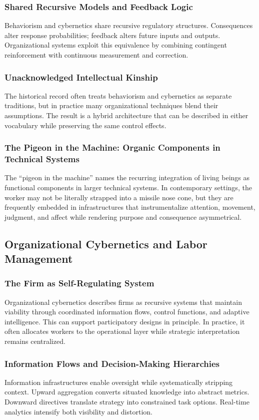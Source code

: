 \documentclass[11pt, a4paper]{article}
\begin{document}
\subsubsection{Shared Recursive Models and Feedback Logic}
Behaviorism and cybernetics share recursive regulatory structures. Consequences alter response probabilities; feedback alters future inputs and outputs. Organizational systems exploit this equivalence by combining contingent reinforcement with continuous measurement and correction.

\subsubsection{Unacknowledged Intellectual Kinship}
The historical record often treats behaviorism and cybernetics as separate traditions, but in practice many organizational techniques blend their assumptions. The result is a hybrid architecture that can be described in either vocabulary while preserving the same control effects.

\subsubsection{The Pigeon in the Machine: Organic Components in Technical Systems}
The ``pigeon in the machine'' names the recurring integration of living beings as functional components in larger technical systems. In contemporary settings, the worker may not be literally strapped into a missile nose cone, but they are frequently embedded in infrastructures that instrumentalize attention, movement, judgment, and affect while rendering purpose and consequence asymmetrical.

\subsection{Organizational Cybernetics and Labor Management}
\subsubsection{The Firm as Self-Regulating System}
Organizational cybernetics describes firms as recursive systems that maintain viability through coordinated information flows, control functions, and adaptive intelligence. This can support participatory designs in principle. In practice, it often allocates workers to the operational layer while strategic interpretation remains centralized.

\subsubsection{Information Flows and Decision-Making Hierarchies}
Information infrastructures enable oversight while systematically stripping context. Upward aggregation converts situated knowledge into abstract metrics. Downward directives translate strategy into constrained task options. Real-time analytics intensify both visibility and distortion.
\end{document}
